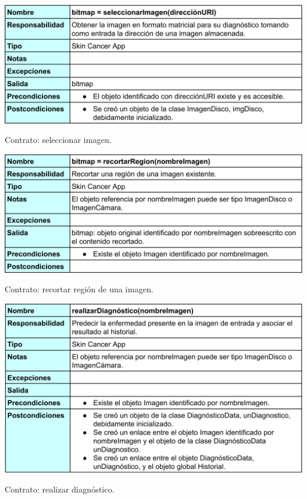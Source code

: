   \begin{table}[H]
 	\centering
 	\includegraphics[scale = 0.16]{imagenes/contrato2.png}
 	\caption{Contrato: seleccionar imagen.}
 	\label{fig:contrato2}
 \end{table}
 
   \begin{table}[H]
 	\centering
 	\includegraphics[scale = 0.16]{imagenes/contrato3.png}
 	\caption{Contrato: recortar región de una imagen.}
 	\label{fig:contrato3}
 \end{table}
 
   \begin{table}[H]
 	\centering
 	\includegraphics[scale = 0.16]{imagenes/contrato4.png}
 	\caption{Contrato: realizar diagnóstico.}
 	\label{fig:contrato4}
 \end{table}
 
